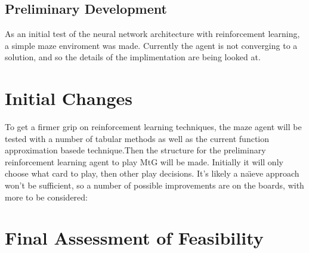     \subsection{Preliminary Development}
      As an initial test of the neural network architecture with reinforcement learning, a simple maze enviroment was made. Currently the agent is not converging to a solution, and so the details of the implimentation are being looked at.

  \section{Initial Changes}
  To get a firmer grip on reinforcement learning techniques, the maze agent will be tested with a number of tabular methods as well as the current function approximation basede technique.Then the structure for the preliminary reinforcement learning agent to play MtG will be made. Initially it will only choose what card to play, then other play decisions. It's likely a na\"\i eve approach won't be sufficient, so a number of possible improvements are on the boards, with more to be considered:

\section{Final Assessment of Feasibility}
